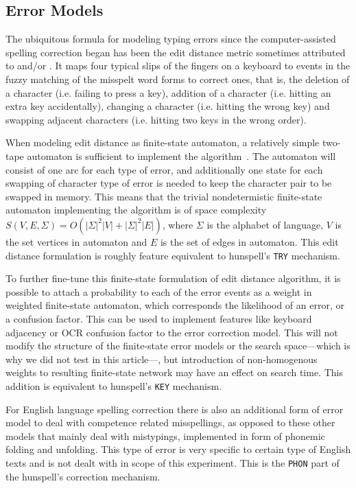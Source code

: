 \documentclass[free]{flammie}
\begin{document}
\subsection{Error Models}
\label{subsec:error-models}

The ubiquitous formula for modeling typing errors since the computer-assisted
spelling correction began has been the edit distance metric sometimes
attributed to \cite{levenshtein/1966} and/or \cite{damerau/1964}. It maps
four typical slips of the fingers on a keyboard to events in the fuzzy matching
of the misspelt word forms to correct ones, that is, the deletion of a
character (i.e. failing to press a key), addition of a character (i.e. hitting
an extra key accidentally), changing a character (i.e. hitting the wrong key)
and swapping adjacent characters (i.e. hitting two keys in the wrong order).

When modeling edit distance as finite-state automaton, a relatively simple
two-tape automaton is sufficient to implement the algorithm~\cite{hassan/2008}.
The automaton will consist of one arc for each type of error, and additionally
one state for each swapping of character type of error is needed to keep the
character pair to be swapped in memory. This means that the trivial
nondetermistic finite-state automaton implementing the algorithm is of space
complexity $S(V, E, \Sigma) = O(|\Sigma|^2 |V| + |\Sigma|^2 |E|)$, where
$\Sigma$ is the alphabet of language, $V$ is the set vertices in automaton and
$E$ is the set of edges in automaton.  This edit distance formulation is
roughly feature equivalent to hunspell's \texttt{TRY} mechanism.

To further fine-tune this finite-state formulation of edit distance algorithm,
it is possible to attach a probability to each of the error events as a weight
in weighted finite-state automaton, which corresponds the likelihood of an
error, or a confusion factor. This can be used to implement features like
keyboard adjacency or OCR confusion factor to the error correction model. This
will not modify the structure of the finite-state error models or the search
space---which is why we did not test in this article---, but introduction of
non-homogenous weights to resulting finite-state network may have an effect on
search time. This addition is equivalent to hunspell's \texttt{KEY} mechanism.

For English language spelling correction there is also an additional form of
error model to deal with competence related misspellings, as opposed to these
other models that mainly deal with mistypings, implemented in form of phonemic
folding and unfolding. This type of error is very specific to certain type of
English texts and is not dealt with in scope of this experiment. This is
the \texttt{PHON} part of the hunspell's correction mechanism.
\end{document}
